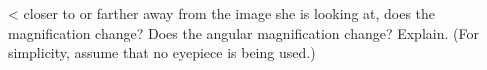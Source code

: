 <%
closer to or farther away from the image she is looking at,
does the magnification change? Does the angular magnification
change? Explain. (For simplicity, assume that no eyepiece is being used.)
